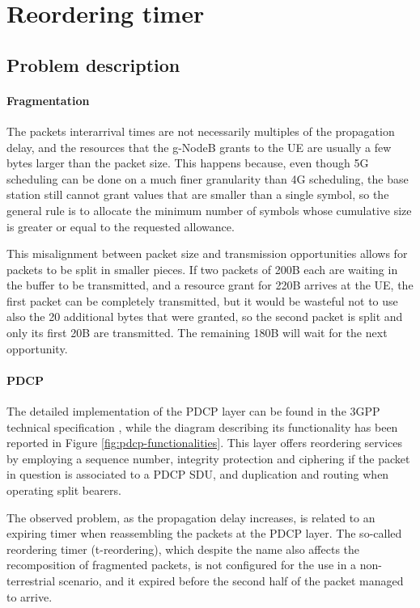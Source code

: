 \section{Reordering timer}
\label{sec:reord-timer}

\subsection{Problem description}
\paragraph{Fragmentation}
The packets interarrival times are not necessarily multiples of the propagation delay, and the resources that the g-NodeB grants to the \ac{UE} are usually a few bytes larger than the packet size. This happens because, even though 5G scheduling can be done on a much finer granularity than 4G scheduling, the base station still cannot grant values that are smaller than a single symbol, so the general rule is to allocate the minimum number of symbols whose cumulative size is greater or equal to the requested allowance.

This misalignment between packet size and transmission opportunities allows for packets to be split in smaller pieces. If two packets of 200B each are waiting in the buffer to be transmitted, and a resource grant for 220B arrives at the \ac{UE}, the first packet can be completely transmitted, but it would be wasteful not to use also the 20 additional bytes that were granted, so the second packet is split and only its first 20B are transmitted. The remaining 180B will wait for the next opportunity.

\paragraph{PDCP}
The detailed implementation of the \ac{PDCP} layer can be found in the \ac{3GPP} technical specification \cite{pdcp-spec-3gpp}, while the diagram describing its functionality has been reported in Figure \ref{fig:pdcp-functionalities}. This layer offers reordering services by employing a sequence number, integrity protection and ciphering if the packet in question is associated to a \ac{PDCP} \ac{SDU}, and duplication and routing when operating split bearers.

The observed problem, as the propagation delay increases, is related to an expiring timer when reassembling the packets at the \ac{PDCP} layer. The so-called reordering timer (t-reordering), which despite the name also affects the recomposition of fragmented packets, is not configured for the use in a non-terrestrial scenario, and it expired before the second half of the packet managed to arrive. 

